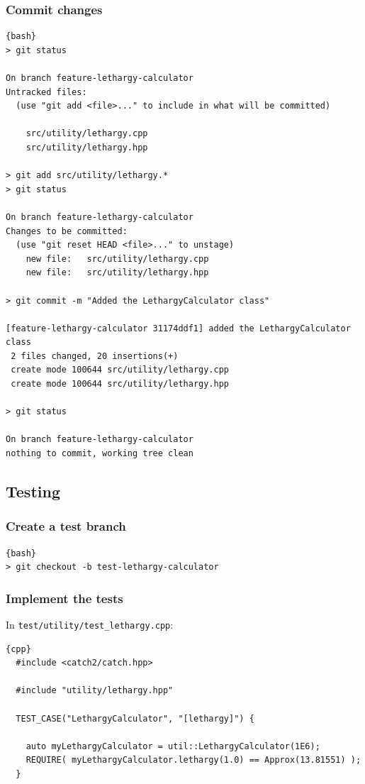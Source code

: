 \documentclass{beamer}
\begin{document}
\begin{frame}[fragile]
\frametitle{Commit changes}
\tiny{
\begin{lstlisting}{bash}
> git status

On branch feature-lethargy-calculator
Untracked files:
  (use "git add <file>..." to include in what will be committed)

	src/utility/lethargy.cpp
	src/utility/lethargy.hpp

> git add src/utility/lethargy.*
> git status 

On branch feature-lethargy-calculator
Changes to be committed:
  (use "git reset HEAD <file>..." to unstage)
	new file:   src/utility/lethargy.cpp
	new file:   src/utility/lethargy.hpp

> git commit -m "Added the LethargyCalculator class"

[feature-lethargy-calculator 31174ddf1] added the LethargyCalculator class
 2 files changed, 20 insertions(+)
 create mode 100644 src/utility/lethargy.cpp
 create mode 100644 src/utility/lethargy.hpp

> git status 

On branch feature-lethargy-calculator
nothing to commit, working tree clean

\end{lstlisting}
}
\end{frame}

\subsection{Testing}

\begin{frame}[fragile]
\frametitle{Create a test branch}
\scriptsize{
\begin{lstlisting}{bash}
> git checkout -b test-lethargy-calculator
\end{lstlisting}
}
\end{frame}

\begin{frame}[fragile]
\frametitle{Implement the tests}

In \verb|test/utility/test_lethargy.cpp|:

\scriptsize{
\begin{lstlisting}{cpp}
  #include <catch2/catch.hpp>
   
  #include "utility/lethargy.hpp"
  
  TEST_CASE("LethargyCalculator", "[lethargy]") {
  
    auto myLethargyCalculator = util::LethargyCalculator(1E6);
    REQUIRE( myLethargyCalculator.lethargy(1.0) == Approx(13.81551) );
  }
\end{lstlisting}
}
\end{frame}
\end{document}
